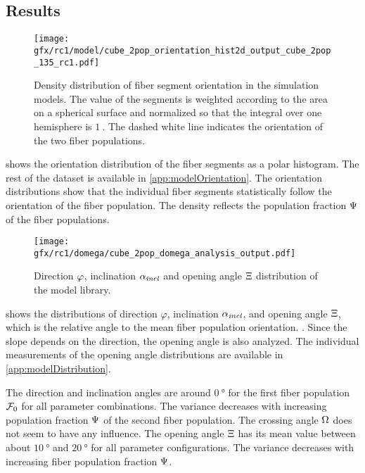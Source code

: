 \subsection{Results}
%
\begin{figure}[!t]
\centering
\texttt{[image: gfx/rc1/model/cube\_2pop\_orientation\_hist2d\_output\_cube\_2pop\_135\_rc1.pdf]}
\caption{Density distribution of fiber segment orientation in the simulation models.
The value of the segments is weighted according to the area on a spherical surface and normalized so that the integral over one hemisphere is $\SI{1}{}$.
The dashed white line indicates the orientation of the two fiber populations.}
\label{fig:modelOrientation}
\end{figure}
%
 shows the orientation distribution of the fiber segments as a polar histogram.
The rest of the dataset is available in \cref{app:modelOrientation}.
The orientation distributions show that the individual fiber segments statistically follow the orientation of the fiber population.
The density reflects the population fraction $\textnormal{$\Psi$}$ of the fiber populations.
\par
% 
\begin{figure}[!t]
    \centering
    \texttt{[image: gfx/rc1/domega/cube\_2pop\_domega\_analysis\_output.pdf]}
    \caption{Direction $\textnormal{$\varphi$}$, inclination $\textnormal{$\alpha_{\mathit{incl}}$}$ and opening angle $\textnormal{$\Xi$}$ distribution of the model library. }
    \label{fig:modelAngleBoxPlot}
\end{figure}
%
 shows the distributions of direction $\varphi$, inclination $\textnormal{$\alpha_{\mathit{incl}}$}$, and opening angle $\textnormal{$\Xi$}$, which is the relative angle to the mean fiber population orientation.
\dummy{}.
Since the slope depends on the direction, the opening angle is also analyzed.
The individual measurements of the opening angle distributions are available in \cref{app:modelDistribution}.
\par
% 
The direction and inclination angles are around $\SI{0}{\degree}$ for the first fiber population $\textnormal{$\mathcal{F}_0$}$ for all parameter combinations.
The variance decreases with increasing population fraction $\textnormal{$\Psi$}$ of the second fiber population.
The crossing angle $\textnormal{$\Omega$}$ does not seem to have any influence.
The opening angle $\textnormal{$\Xi$}$ has its mean value between about $\SI{10}{\degree}$ and $\SI{20}{\degree}$ for all parameter configurations.
The variance decreases with increasing fiber population fraction $\textnormal{$\Psi$}$.
